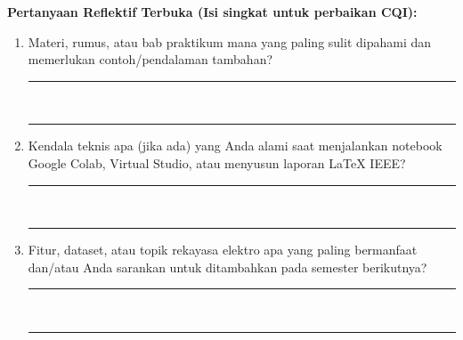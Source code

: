 \documentclass[10.5pt,a4paper]{article}
\begin{document}
\vspace{0.25cm}
\noindent\textbf{Pertanyaan Reflektif Terbuka (Isi singkat untuk perbaikan CQI):}
\begin{enumerate}[label=\textbf{\arabic*.}, leftmargin=1.5em, itemsep=6pt]
    \item Materi, rumus, atau bab praktikum mana yang paling sulit dipahami dan memerlukan contoh/pendalaman tambahan?\\
    \rule{\textwidth}{0.4pt}\\[0.25cm]
    \rule{\textwidth}{0.4pt}
    \item Kendala teknis apa (jika ada) yang Anda alami saat menjalankan notebook Google Colab, Virtual Studio, atau menyusun laporan LaTeX IEEE?\\
    \rule{\textwidth}{0.4pt}\\[0.25cm]
    \rule{\textwidth}{0.4pt}
    \item Fitur, dataset, atau topik rekayasa elektro apa yang paling bermanfaat dan/atau Anda sarankan untuk ditambahkan pada semester berikutnya?\\
    \rule{\textwidth}{0.4pt}\\[0.25cm]
    \rule{\textwidth}{0.4pt}
\end{enumerate}
\end{document}
